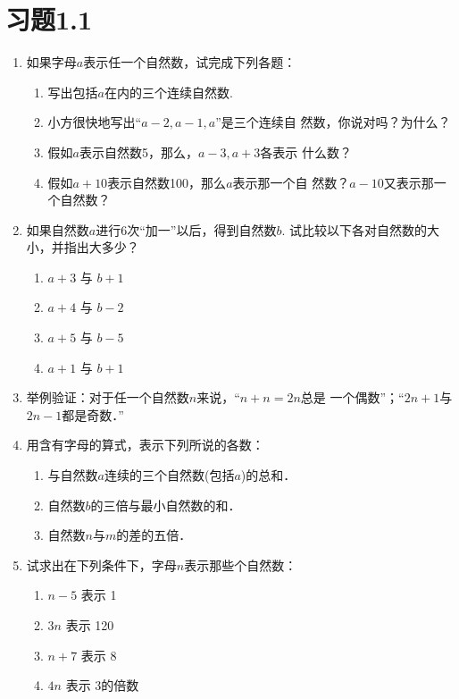 \section*{习题1.1}

\begin{enumerate}
\item 如果字母$a$表示任一个自然数，试完成下列各题：
    \begin{enumerate}
        \item 写出包括$a$在内的三个连续自然数.
        \item 小方很快地写出“$a-2, a-1, a$”是三个连续自
  然数，你说对吗？为什么？
  \item 假如$a$表示自然数5，那么，$a-3,a+3$各表示
  什么数？
  \item 假如$a+10$表示自然数100，那么$a$表示那一个自
  然数？$a-10$又表示那一个自然数？
  
    \end{enumerate}

\item  如果自然数$a$进行6次“加一”以后，得到自然数$b$.
试比较以下各对自然数的大小，并指出大多少？
   \begin{multicols}{2}
\begin{enumerate}
    \item $a+3$ 与 $b+1$
    \item $a+4$ 与 $b-2$
    \item $a+5$ 与 $b-5$
    \item $a+1$ 与 $b+1$
\end{enumerate}
\end{multicols}

\item  举例验证：对于任一个自然数$n$来说，“$n+n=2n$总是
一个偶数”；“$2n + 1$与$2n-1$都是奇数．”

\item 用含有字母的算式，表示下列所说的各数：
\begin{enumerate}
    \item 与自然数$a$连续的三个自然数(包括$a$)的总和．
    \item 自然数$b$的三倍与最小自然数的和．
    \item 自然数$n$与$m$的差的五倍．
\end{enumerate}

\item 试求出在下列条件下，字母$n$表示那些个自然数：
\begin{enumerate}
    \item $n-5$ 表示 1
    \item  $3n$ 表示 120
    \item  $n+7$ 表示 8
    \item  $4n$ 表示 3的倍数
\end{enumerate}


\end{enumerate}
